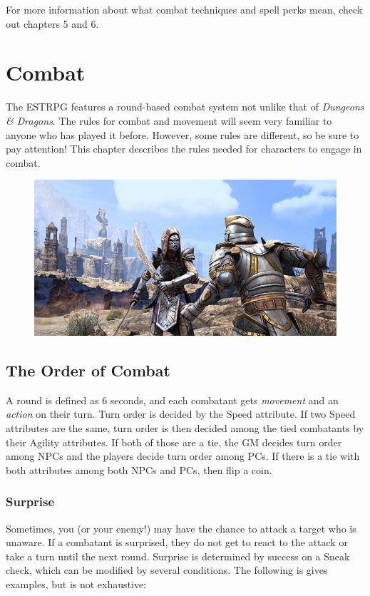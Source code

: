 \documentclass[12pt]{book}
\begin{document}
For more information about what combat techniques and spell perks mean, check out chapters 5 and 6.

\chapter{Combat}

The ESTRPG features a round-based combat system not unlike that of \textit{Dungeons \& Dragons}. The rules for combat and movement will seem very familiar to anyone who has played it before. However, some rules are different, so be sure to pay attention! This chapter describes the rules needed for characters to engage in combat.

\begin{figure}[H]
	\includegraphics[width=\textwidth]{combat.png}
\end{figure}

\section{The Order of Combat}

A round is defined as 6 seconds, and each combatant gets \textit{movement} and an \textit{action} on their turn. Turn order is decided by the Speed attribute. If two Speed attributes are the same, turn order is then decided among the tied combatants by their Agility attributes. If both of those are a tie, the GM decides turn order among NPCs and the players decide turn order among PCs. If there is a tie with both attributes among both NPCs and PCs, then flip a coin.

\subsection{Surprise}

Sometimes, you (or your enemy!) may have the chance to attack a target who is unaware. If a combatant is surprised, they do not get to react to the attack or take a turn until the next round. Surprise is determined by success on a Sneak check, which can be modified by several conditions. The following is gives examples, but is not exhaustive:
\end{document}
